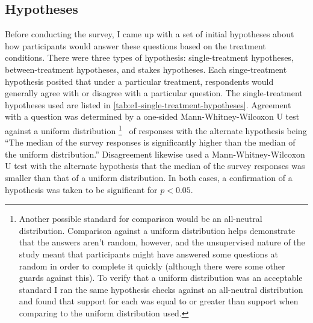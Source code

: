 \subsection{Hypotheses}

\label{sec:e2-hypotheses}

Before conducting the survey, I came up with a set of initial hypotheses about how participants would answer these questions based on the treatment conditions.
%
There were three types of hypothesis: single-treatment hypotheses, between-treatment hypotheses, and stakes hypotheses.
%
Each singe-treatment hypothesis posited that under a particular treatment, respondents would generally agree with or disagree with a particular question.
%
The single-treatment hypotheses used are listed in \cref{tab:e1-single-treatment-hypotheses}.
%
Agreement with a question was determined by a one-sided Mann-Whitney-Wilcoxon U test \citep{Mann1947,Wilcoxon1945} against a uniform distribution%
\footnote{%
Another possible standard for comparison would be an all-neutral distribution.
%
Comparison against a uniform distribution helps demonstrate that the answers aren't random, however, and the unsupervised nature of the study meant that participants might have answered some questions at random in order to complete it quickly (although there were some other guards against this).
%
To verify that a uniform distribution was an acceptable standard I ran the same hypothesis checks against an all-neutral distribution and found that support for each was equal to or greater than support when comparing to the uniform distribution used.
}%
\ of responses with the alternate hypothesis being ``The median of the survey responses is significantly higher than the median of the uniform distribution.''
%
Disagreement likewise used a Mann-Whitney-Wilcoxon U test with the alternate hypothesis that the median of the survey responses was smaller than that of a uniform distribution.
%
In both cases, a confirmation of a hypothesis was taken to be significant for $p < 0.05$.



